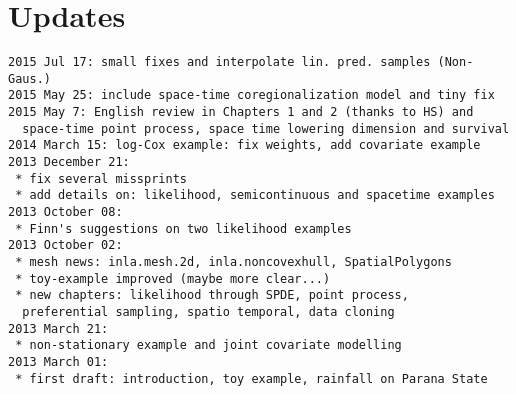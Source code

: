 \section{Updates}
\begin{verbatim}
2015 Jul 17: small fixes and interpolate lin. pred. samples (Non-Gaus.)
2015 May 25: include space-time coregionalization model and tiny fix
2015 May 7: English review in Chapters 1 and 2 (thanks to HS) and 
  space-time point process, space time lowering dimension and survival
2014 March 15: log-Cox example: fix weights, add covariate example
2013 December 21: 
 * fix several missprints
 * add details on: likelihood, semicontinuous and spacetime examples 
2013 October 08: 
 * Finn's suggestions on two likelihood examples 
2013 October 02:
 * mesh news: inla.mesh.2d, inla.noncovexhull, SpatialPolygons 
 * toy-example improved (maybe more clear...) 
 * new chapters: likelihood through SPDE, point process, 
  preferential sampling, spatio temporal, data cloning
2013 March 21:
 * non-stationary example and joint covariate modelling
2013 March 01: 
 * first draft: introduction, toy example, rainfall on Parana State
\end{verbatim}
